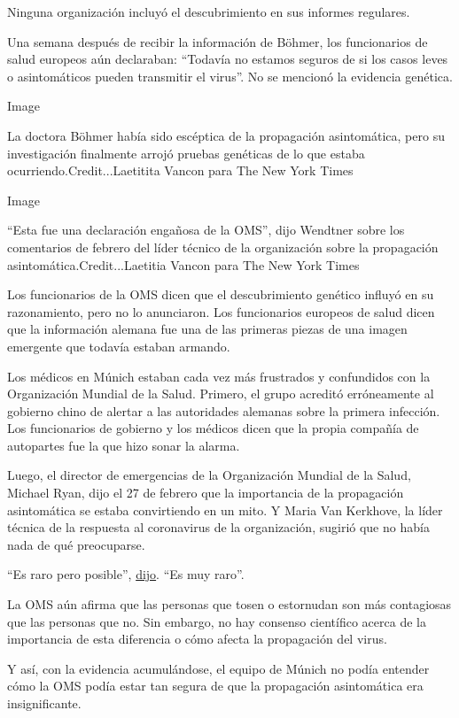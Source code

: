 Ninguna organización incluyó el descubrimiento en sus informes
regulares.

Una semana después de recibir la información de Böhmer, los funcionarios
de salud europeos aún declaraban: ``Todavía no estamos seguros de si los
casos leves o asintomáticos pueden transmitir el virus''. No se mencionó
la evidencia genética.

Image

La doctora Böhmer había sido escéptica de la propagación asintomática,
pero su investigación finalmente arrojó pruebas genéticas de lo que
estaba ocurriendo.Credit...Laetitita Vancon para The New York Times

Image

``Esta fue una declaración engañosa de la OMS'', dijo Wendtner sobre los
comentarios de febrero del líder técnico de la organización sobre la
propagación asintomática.Credit...Laetitia Vancon para The New York
Times

Los funcionarios de la OMS dicen que el descubrimiento genético influyó
en su razonamiento, pero no lo anunciaron. Los funcionarios europeos de
salud dicen que la información alemana fue una de las primeras piezas de
una imagen emergente que todavía estaban armando.

Los médicos en Múnich estaban cada vez más frustrados y confundidos con
la Organización Mundial de la Salud. Primero, el grupo acreditó
erróneamente al gobierno chino de alertar a las autoridades alemanas
sobre la primera infección. Los funcionarios de gobierno y los médicos
dicen que la propia compañía de autopartes fue la que hizo sonar la
alarma.

Luego, el director de emergencias de la Organización Mundial de la
Salud, Michael Ryan, dijo el 27 de febrero que la importancia de la
propagación asintomática se estaba convirtiendo en un mito. Y Maria Van
Kerkhove, la líder técnica de la respuesta al coronavirus de la
organización, sugirió que no había nada de qué preocuparse.

``Es raro pero posible'',
\href{https://www.youtube.com/watch?v=SCgCzYAHusA\&t=22m55s}{dijo}. ``Es
muy raro''.

La OMS aún afirma que las personas que tosen o estornudan son más
contagiosas que las personas que no. Sin embargo, no hay consenso
científico acerca de la importancia de esta diferencia o cómo afecta la
propagación del virus.

Y así, con la evidencia acumulándose, el equipo de Múnich no podía
entender cómo la OMS podía estar tan segura de que la propagación
asintomática era insignificante.

